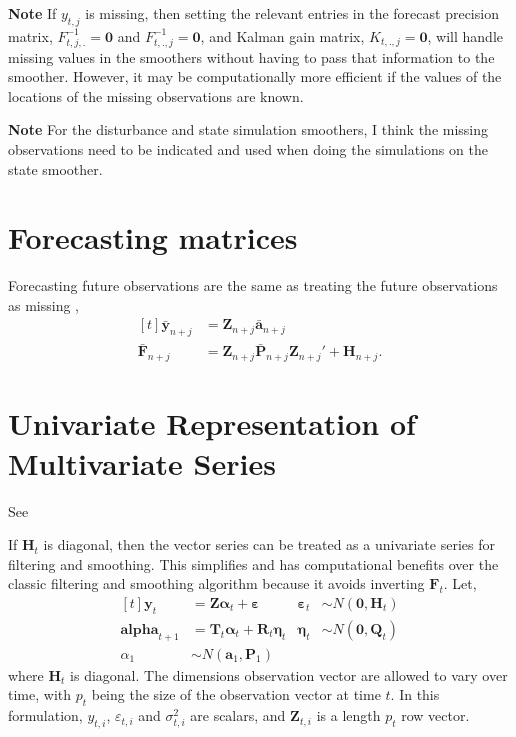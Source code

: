 \documentclass[]{book}
\newcommand{\mat}[1]{\boldsymbol{#1}}
\renewcommand{\vec}[1]{\boldsymbol{#1}}
\renewcommand{\T}{'}
\begin{document}
\textbf{Note} If \(y_{t,j}\) is missing, then setting the relevant
entries in the forecast precision matrix, \(F^{-1}_{t,j,.} = \vec{0}\)
and \(F^{-1}_{t,.,j} = \vec{0}\), and Kalman gain matrix,
\(K_{t,.,j} = \vec{0}\), will handle missing values in the smoothers
without having to pass that information to the smoother. However, it may
be computationally more efficient if the values of the locations of the
missing observations are known.

\textbf{Note} For the disturbance and state simulation smoothers, I
think the missing observations need to be indicated and used when doing
the simulations on the state smoother.

\section{Forecasting matrices}\label{forecasting-matrices}

Forecasting future observations are the same as treating the future
observations as missing \autocite[Sec 4.11]{DurbinKoopman2012}, \[
\begin{aligned}[t]
\bar{\vec{y}}_{n + j} &= \mat{Z}_{n + j} \bar{\vec{a}}_{n + j} \\
\bar{\mat{F}}_{n + j} &= \mat{Z}_{n + j} \bar{\mat{P}}_{n + j} \mat{Z}_{n + j}\T + \mat{H}_{n + j} .
\end{aligned}
\]

\section{Univariate Representation of Multivariate
Series}\label{univariate-representation-of-multivariate-series}

See \autocite[Ch 6]{DurbinKoopman2012}

If \(\mat{H}_t\) is diagonal, then the vector series can be treated as a
univariate series for filtering and smoothing. This simplifies and has
computational benefits over the classic filtering and smoothing
algorithm because it avoids inverting \(\mat{F}_t\). Let, \[
\begin{aligned}[t]
\vec{y}_t &= \mat{Z} \vec{\alpha}_t + \vec{\varepsilon} & \vec{\varepsilon}_t &\sim N(\vec{0}, \mat{H}_t) \\
\vec{alpha}_{t + 1} &= \mat{T}_t \vec{\alpha}_t + \mat{R}_t \vec{\eta}_t & \vec{\eta}_t & \sim N(\vec{0}, \mat{Q}_t) \\
\alpha_1 & \sim N(\vec{a}_1, \mat{P}_1)
\end{aligned}
\] where \(\mat{H}_t\) is diagonal. The dimensions observation vector
are allowed to vary over time, with \(p_t\) being the size of the
observation vector at time \(t\). In this formulation, \(y_{t,i}\),
\(\varepsilon_{t,i}\) and \(\sigma^2_{t,i}\) are scalars, and
\(\vec{Z}_{t,i}\) is a length \(p_t\) row vector.
\end{document}
